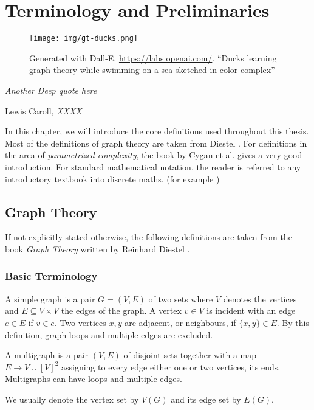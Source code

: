 \chapter{Terminology and Preliminaries}\label{ch:prelim}

\vspace*{-50pt}

\begin{figure}[ht]
        \texttt{[image: img/gt-ducks.png]}
        \captionsetup{textformat=empty,labelformat=blank}
        \caption{Generated with Dall-E. \url{https://labs.openai.com/}. ``Ducks learning graph theory while swimming on a sea sketched in color complex''}
\end{figure}

\epigraph{\itshape Another Deep quote here}{Lewis Caroll, \textit{XXXX}}


In this chapter, we will introduce the core definitions used throughout this thesis. 
Most of the definitions of graph theory are taken from Diestel \cite{Diekert2005}. 
For definitions in the area of \textit{parametrized complexity}, the book by Cygan et al.\cite{Cygan2015} gives a very good introduction.
For standard mathematical notation, the reader is referred to any introductory textbook into discrete maths. (for example \cite{Rosen2012})

\section{Graph Theory}

If not explicitly stated otherwise, the following definitions are taken from the book \textit{Graph Theory} written by Reinhard Diestel \cite{diestel10}.

\subsection{Basic Terminology}

\begin{definition}[Graph]
    A simple graph is a pair $G = (V, E)$ of two sets where $V$ denotes the vertices and $E \subseteq V \times V$ the edges of the graph.  A vertex $v \in V$ is incident with an edge $e \in E$ if $v \in e$. Two vertices $x, y$ are adjacent, or neighbours, if $\{x,y \} \in E$. By this definition, graph loops and multiple edges are excluded.
    
    A multigraph is a pair $(V,E)$ of disjoint sets together with a map $E \rightarrow V \cup [V]^2$ assigning to every edge either one or two vertices, its ends. Multigraphs can have loops and multiple edges.
    
    We usually denote the vertex set by $V(G)$ and its edge set by $E(G)$.


\end{definition}

